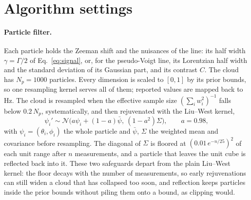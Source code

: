 \section{Algorithm settings}
\label{sm:algorithm}

\paragraph{Particle filter.} Each particle holds the Zeeman shift and the nuisances of the line: its half width
$\gamma=\Gamma/2$ of Eq.~\eqref{eq:signal}, or, for the pseudo-Voigt line, its Lorentzian half width and the standard
deviation of its Gaussian part, and its contrast $C$. The cloud has $N_p=1000$ particles. Every dimension is scaled to $[0,1]$ by its prior
bounds, so one resampling kernel serves all of them; reported values are mapped back to Hz. The cloud is resampled
when the effective sample size $(\sum_i w_i^2)^{-1}$ falls below $0.2\,N_p$, systematically, and then rejuvenated with
the Liu--West kernel,
\begin{equation}
  \psi_i'\sim\mathcal N\big(a\psi_i+(1-a)\bar\psi,\ (1-a^2)\Sigma\big),\qquad a=0.98,
  \label{eq:liuwest}
\end{equation}
with $\psi_i=(\theta_i,\phi_i)$ the whole particle and $\bar\psi$, $\Sigma$ the weighted mean and covariance before
resampling. The diagonal of $\Sigma$ is floored at $(0.01\,e^{-n/25})^2$ of each unit range after $n$ measurements,
and a particle that leaves the unit cube is reflected back into it. These two safeguards depart from the plain
Liu--West kernel: the floor decays with the number of measurements, so early rejuvenations can still widen a cloud
that has collapsed too soon, and reflection keeps particles inside the prior bounds without piling them onto a bound,
as clipping would.

